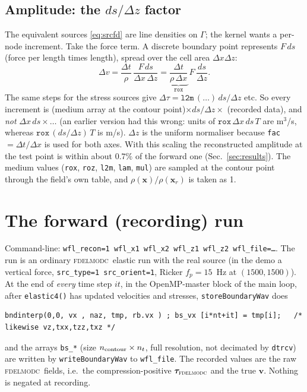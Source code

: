\documentclass[11pt,a4paper]{article}
\newcommand{\vv}{\mathbf v}
\newcommand{\fd}{\textsc{fdelmodc}}
\begin{document}
\subsection{Amplitude: the $ds/\Delta z$ factor}
The equivalent sources \eqref{eq:srcfd} are line densities on $\Gamma$; the
kernel wants a per-node increment. Take the force term. A discrete boundary
point represents $F\,ds$ (force per length times length), spread over the
cell area $\Delta x\Delta z$:
\[
\Delta v=\frac{\Delta t}{\rho}\,\frac{F\,ds}{\Delta x\,\Delta z}
=\underbrace{\frac{\Delta t}{\rho\,\Delta x}}_{\texttt{rox}}\,F\,\frac{ds}{\Delta z}.
\]
The same steps for the stress sources give $\Delta\tau=\texttt{l2m}\,(\dots)\,ds/\Delta z$
etc. So every increment is (medium array at the contour point)$\times ds/\Delta z\times$
(recorded data), and \emph{not} $\Delta x\,ds\times\dots$ (an earlier version had
this wrong: units of $\texttt{rox}\,\Delta x\,ds\,T$ are m$^3$/s, whereas
$\texttt{rox}\,(ds/\Delta z)\,T$ is m/s).
$\Delta z$ is the uniform normaliser because \texttt{fac}$=\Delta t/\Delta x$ is used for
both axes. With this scaling the reconstructed amplitude at the test point is
within about $0.7\%$ of the forward one (Sec.~\ref{sec:results}).
The medium values (\texttt{rox}, \texttt{roz}, \texttt{l2m}, \texttt{lam},
\texttt{mul}) are sampled at the contour point through the field's own table,
and $\rho(\bm x)/\rho(\bm x_r)$ is taken as 1.

\section{The forward (recording) run}
Command-line: \texttt{wfl\_recon=1 wfl\_x1 wfl\_x2 wfl\_z1 wfl\_z2 wfl\_file=\dots}.
The run is an ordinary \fd\ elastic run with the real source (in the demo a
vertical force, \texttt{src\_type=1 src\_orient=1}, Ricker $f_p=15$~Hz at
$(1500,1500)$). At the end of \emph{every} time step $it$, in the OpenMP-master
block of the main loop, after \texttt{elastic4()} has updated velocities and
stresses, \texttt{storeBoundaryWav} does
\begin{lstlisting}
bndinterp(0,0, vx , naz, tmp, rb.vx ) ; bs_vx [i*nt+it] = tmp[i];   /* likewise vz,txx,tzz,txz */
\end{lstlisting}
and the arrays \texttt{bs\_*} (size $n_{\rm contour}\times n_t$, full resolution,
not decimated by \texttt{dtrcv}) are written by \texttt{writeBoundaryWav} to
\texttt{wfl\_file}. The recorded values are the raw \fd\ fields, i.e.\ the
compression-positive $\bm\tau_\fd$ and the true $\vv$. Nothing is negated at
recording.
\end{document}
